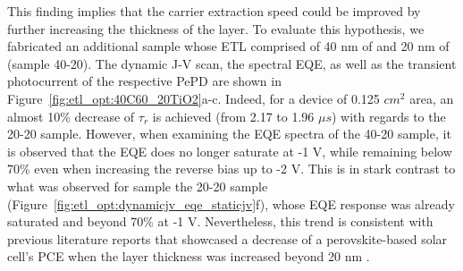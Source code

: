 This finding implies that the carrier extraction speed could be improved by further increasing the thickness of the  layer. To evaluate this hypothesis, we fabricated an additional sample whose ETL comprised of 40 nm of  and 20 nm of  (sample 40-20). The dynamic J-V scan, the spectral EQE, as well as the transient photocurrent of the respective PePD are shown in Figure~\ref{fig:etl_opt:40C60_20TiO2}a-c. Indeed, for a device of 0.125 $cm^2$ area, an almost 10\% decrease of $\tau_r$ is achieved (from 2.17 to 1.96 $\mu s$) with regards to the 20-20 sample. However, when examining the EQE spectra of the 40-20 sample, it is observed that the EQE does no longer saturate at -1 V, while remaining below 70\% even when increasing the reverse bias up to -2 V. This is in stark contrast to what was observed for sample the 20-20 sample (Figure~\ref{fig:etl_opt:dynamicjv_eqe_staticjv}f), whose EQE response was already saturated and beyond 70\% at -1 V. Nevertheless, this trend is consistent with previous literature reports that showcased a decrease of a perovskite-based solar cell's PCE when the  layer thickness was increased beyond 20 nm \cite{Klipfel2022C60Layer}.


